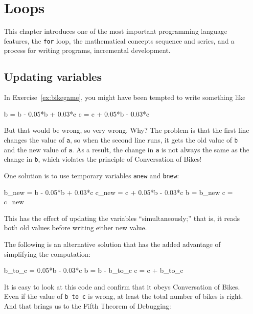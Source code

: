 \documentclass[main.tex]{subfiles}
\begin{document}
\chapter{Loops}

This chapter introduces one of the most important programming language features, the {\tt for} loop, the mathematical concepts sequence and series, and a process for writing programs, incremental development.

\section{Updating variables}

In Exercise~\ref{ex:bikegame}, you might have been tempted to write something
like


\begin{code}
b = b - 0.05*b + 0.03*c
c = c + 0.05*b - 0.03*c
\end{code}

But that would be wrong, so very wrong.  Why?  The problem is that
the first line changes the value of {\tt a}, so when the second line
runs, it gets the old value of {\tt b} and the new value of {\tt a}.
As a result, the change in {\tt a} is not always the same as the
change in {\tt b}, which violates the principle of Conversation
of Bikes!

One solution is to use temporary variables {\tt anew} and {\tt bnew}:

\begin{code}
b_new = b - 0.05*b + 0.03*c
c_new = c + 0.05*b - 0.03*c
b = b_new
c = c_new
\end{code}

This has the effect of updating the variables ``simultaneously;'' that
is, it reads both old values before writing either new value.


The following is an alternative solution that
has the added advantage of simplifying the computation:

\begin{code}
b_to_c = 0.05*b - 0.03*c
b = b - b_to_c
c = c + b_to_c
\end{code}


It is easy to look at this code and confirm that it obeys Conversation
of Bikes.  Even if the value of \verb"b_to_c" is wrong, at least the total
number of bikes is right.  And that brings us to the Fifth Theorem of
Debugging:
\end{document}
